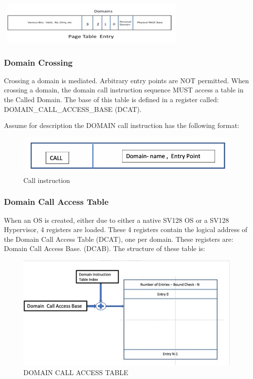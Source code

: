 \documentclass{article}
\begin{document}
\begin{center}
\includegraphics[scale = .9]
{figures/figure2b_pte.jpg}
\centering
\end{center}

\subsubsection{Domain Crossing}

Crossing a domain is mediated.  Arbitrary entry  points are NOT  permitted. When crossing a domain,  the domain call instruction sequence MUST access a table in the Called Domain. The base of this table is defined in a register called: DOMAIN\_CALL\_ACCESS\_BASE (DCAT). 


 Assume for description the DOMAIN call instruction has the following format:

\begin{figure}[h]
\begin{center}
\includegraphics[scale=.4]
{figures/figure3_call_instruction.jpg}
\caption{Call instruction}
\end{center}
\end{figure}


\subsubsection{Domain Call Access Table}

When an OS is created, either due to either a native SV128 OS or a SV128 Hypervisor,  4 registers are loaded.  These 4 registers  contain the logical address of the Domain Call Access Table (DCAT),  one per domain.   These registers are:  Domain Call Access Base.  (DCAB). The structure of  these table is:

\begin{figure}[h]
\begin{center}
\includegraphics[scale = .4]
{figures/domain_call_table_index.jpg}
\caption{DOMAIN CALL ACCESS TABLE}
\end{center}
\end{figure}
\end{document}
